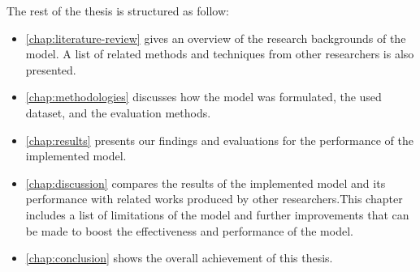 The rest of the thesis is structured as follow:
\begin{itemize}
    \item \autoref{chap:literature-review} gives an overview of the research backgrounds of the model.
    A list of related methods and techniques from other researchers is also presented.
    \item \autoref{chap:methodologies} discusses how the model was formulated, the used dataset, and the evaluation methods.
    \item \autoref{chap:results} presents our findings and evaluations for the performance of the implemented model.
    \item \autoref{chap:discussion} compares the results of the implemented model and its performance with related works produced by other researchers.This chapter includes a list of limitations of the model and further improvements that can be made to boost the effectiveness and performance of the model.
    \item \autoref{chap:conclusion} shows the overall achievement of this thesis.
\end{itemize}